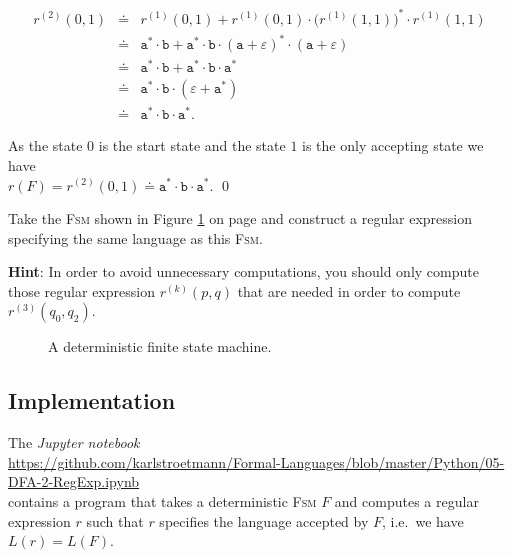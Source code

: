 \begin{enumerate}
            \begin{eqnarray*}
                  r^{(2)}(0, 1)
            & \doteq & r^{(1)}(0, 1) + 
                  r^{(1)}(0, 1) \cdot \bigl(r^{(1)}(1, 1)\bigr)^* \cdot r^{(1)}(1, 1) \\
            & \doteq & \texttt{a}^* \cdot \texttt{b} + 
                  \texttt{a}^* \cdot \texttt{b} \cdot (\texttt{a} + \varepsilon)^* \cdot (\texttt{a} + \varepsilon) \\
            & \doteq & \texttt{a}^* \cdot \texttt{b} + \texttt{a}^* \cdot \texttt{b} \cdot \texttt{a}^* \\
            & \doteq & \texttt{a}^* \cdot \texttt{b} \cdot (\varepsilon + \texttt{a}^*) \\
            & \doteq & \texttt{a}^* \cdot \texttt{b} \cdot \texttt{a}^*.
        \end{eqnarray*}
\end{enumerate}
As the state 0 is the start state and the state $1$ is the only accepting state we have
\\[0.2cm]
\hspace*{1.3cm}
$r(F) = r^{(2)}(0, 1) \doteq \texttt{a}^* \cdot \texttt{b} \cdot \texttt{a}^*$.
\qed


\exerciseEng
Take the \textsc{Fsm} shown in Figure \ref{fig:exercise-13.eps} on page
\pageref{fig:exercise-13.eps} and construct a regular expression specifying the same language as this
\textsc{Fsm}.
\vspace*{0.1cm}

\noindent
\textbf{Hint}: In order to avoid unnecessary computations, you should only compute those regular expression
$r^{(k)}(p, q)$ that are needed in order to compute $r^{(3)}(q_0, q_2)$. 
\eox

\begin{figure}[!ht]
  \centering
{}
\caption{A deterministic finite state machine.}
\label{fig:exercise-13.eps}
\end{figure}

\subsection{Implementation}
The \textsl{Jupyter notebook} 
\\[0.2cm]
\hspace*{1.3cm}
\href{https://github.com/karlstroetmann/Formal-Languages/blob/master/Python/05-DFA-2-RegExp.ipynb}{https://github.com/karlstroetmann/Formal-Languages/blob/master/Python/05-DFA-2-RegExp.ipynb}
\\[0.2cm]
contains a program that takes a deterministic \textsc{Fsm} $F$ and computes a regular expression $r$ such that
$r$ specifies the language accepted by $F$, i.e.~we have $L(r) = L(F)$.

